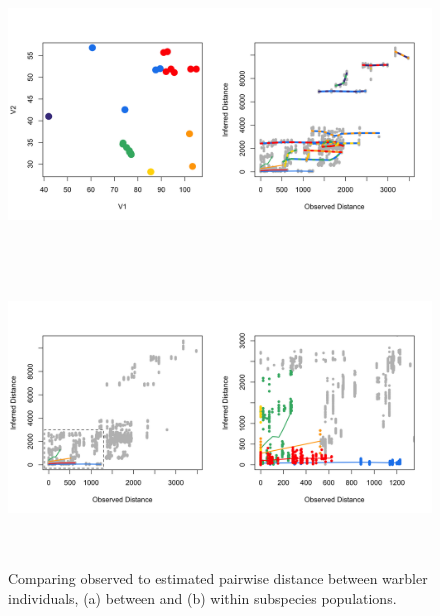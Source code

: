 \documentclass[12pt]{article}
\begin{document}
\begin{figure}
	\centering
			{\includegraphics[width=6in,height=3in]{figs/warblers/warb_ind_dist_compare_allpairs.png}}
			{\includegraphics[width=6in,height=3in]{figs/warblers/warb_ind_dist_compare.png}}
	\caption{Comparing observed to estimated pairwise distance between warbler individuals, (a) between and (b) within subspecies populations.}\label{sfig:warb_ind_distcomp}
\end{figure}
\end{document}
